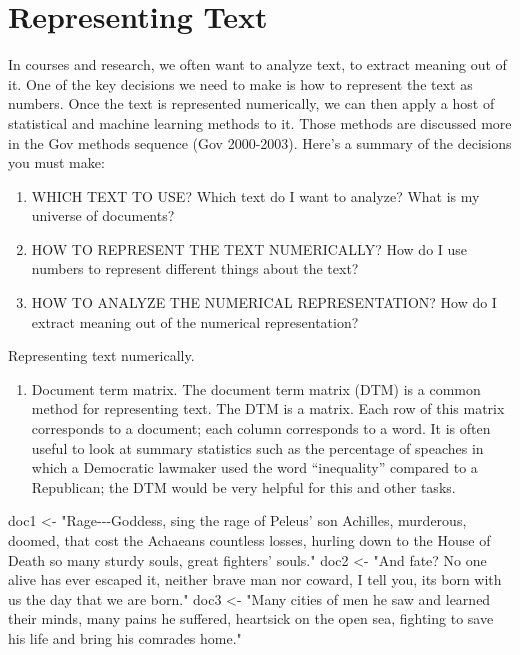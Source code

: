 \documentclass[
]{book}
\newenvironment{Shaded}{\begin{snugshade}}{\end{snugshade}}
\newcommand{\NormalTok}[1]{#1}
\newcommand{\StringTok}[1]{\textcolor[rgb]{0.31,0.60,0.02}{#1}}
\providecommand{\tightlist}{%
  \setlength{\itemsep}{0pt}\setlength{\parskip}{0pt}}
\theoremstyle{definition}
\theoremstyle{definition}
\theoremstyle{definition}
\theoremstyle{remark}
\begin{document}
\hypertarget{representing-text}{%
\section{Representing Text}\label{representing-text}}

In courses and research, we often want to analyze text, to extract meaning out of it.
One of the key decisions we need to make is how to represent the text as numbers.
Once the text is represented numerically, we can then apply a host of statistical
and machine learning methods to it. Those methods are discussed more in the Gov methods sequence (Gov 2000-2003). Here's a summary of the decisions you must make:

\begin{enumerate}
\def\labelenumi{\arabic{enumi}.}
\tightlist
\item
  WHICH TEXT TO USE? Which text do I want to analyze? What is my universe of documents?
\item
  HOW TO REPRESENT THE TEXT NUMERICALLY? How do I use numbers to represent different things about the text?
\item
  HOW TO ANALYZE THE NUMERICAL REPRESENTATION? How do I extract meaning out of the numerical representation?
\end{enumerate}

Representing text numerically.

\begin{enumerate}
\def\labelenumi{\arabic{enumi}.}
\tightlist
\item
  Document term matrix. The document term matrix (DTM) is a common method for representing text. The DTM is a matrix. Each row of this matrix corresponds to a document; each column corresponds to a word. It is often useful to look at summary statistics such as the percentage of speaches in which a Democratic lawmaker used the word ``inequality'' compared to a Republican; the DTM would be very helpful for this and other tasks.
\end{enumerate}

\begin{Shaded}
\begin{Highlighting}[]
\NormalTok{doc1 <{-}}\StringTok{ "Rage{-}{-}{-}Goddess, sing the rage of Peleus’ son Achilles,}
\StringTok{         murderous, doomed, that cost the Achaeans countless losses,}
\StringTok{         hurling down to the House of Death so many sturdy souls,}
\StringTok{         great fighters’ souls."}
\NormalTok{doc2 <{-}}\StringTok{ "And fate? No one alive has ever escaped it,}
\StringTok{         neither brave man nor coward, I tell you, }
\StringTok{         it\textquotesingle{}s born with us the day that we are born."}
\NormalTok{doc3 <{-}}\StringTok{ "Many cities of men he saw and learned their minds,}
\StringTok{         many pains he suffered, heartsick on the open sea,}
\StringTok{         fighting to save his life and bring his comrades home."}
\end{Highlighting}
\end{Shaded}
\end{document}

